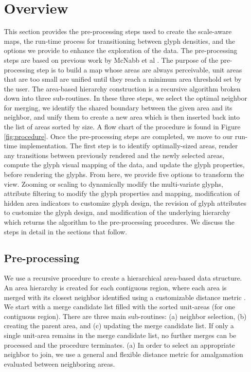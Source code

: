 \section{Overview} \label{fig:overview}
This section provides the pre-processing steps used to create the scale-aware maps, the run-time process for transitioning between glyph densities, and the options we provide to enhance the exploration of the data. The pre-processing steps are based on  previous work by McNabb et al \cite{mcnabb2018dynamic}. The purpose of the pre-processing step is to build a map whose areas are always perceivable, unit areas that are too small \cite{mcnabb2018when} are unified until they reach a minimum area threshold set by the user. The area-based hierarchy construction is a recursive algorithm broken down into three sub-routines. In these three steps, we select the optimal neighbor for merging, we identify the shared boundary between the given area and its neighbor, and unify them to create a new area which is then inserted back into the list of areas sorted by size. A flow chart of the procedure is found in Figure \ref{fig:procedure}. 
Once the pre-processing steps are completed, we move to our run-time implementation. The first step is to identify optimally-sized areas, render any transitions between previously rendered and the newly selected areas, compute the glyph visual mapping of the data, and update the glyph properties, before rendering the glyphs. From here, we provide five options to transform the view. Zooming or scaling to dynamically modify the multi-variate glyphs, attribute filtering to modify the glyph properties and mapping, modification of hidden area indicators to customize glyph design, the revision of glyph attributes to customize the glyph design, and modification of the underlying hierarchy which returns the algorithm to the pre-processing procedures. We discuss the steps in detail in the sections that follow.

\subsection{Pre-processing}
We use a recursive procedure to create a hierarchical area-based data structure. An area hierarchy is created for each contiguous region, where each area is merged with its closest neighbor identified using a customizable distance metric \cite{mcnabb2018dynamic}. We start with a merge candidate list filled with the sorted unit-areas (for one contiguous region). There are three main sub-routines: (a) neighbor selection, (b) creating the parent area, and (c) updating the merge candidate list. If only a single unit-area remains in the merge candidate list, no further merges can be processed and the procedure terminates. (a) In order to select an appropriate neighbor to join, we use a general and flexible distance metric for amalgamation evaluated between neighboring areas.

